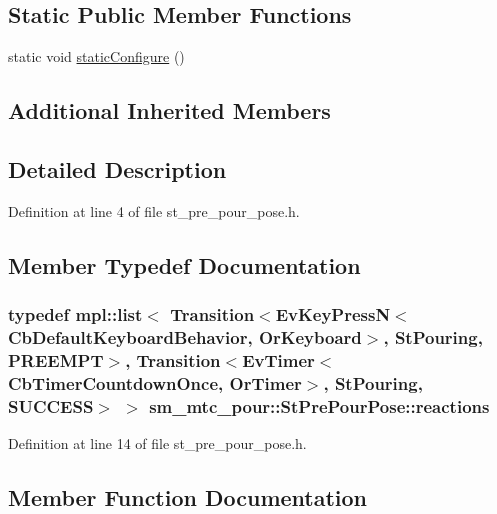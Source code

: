 \subsection*{Static Public Member Functions}
\begin{DoxyCompactItemize}
\item 
static void \hyperlink{structsm__mtc__pour_1_1StPrePourPose_a629a2d7af5a141c4f46159dc5873c051}{static\+Configure} ()
\end{DoxyCompactItemize}
\subsection*{Additional Inherited Members}


\subsection{Detailed Description}


Definition at line 4 of file st\+\_\+pre\+\_\+pour\+\_\+pose.\+h.



\subsection{Member Typedef Documentation}
\subsubsection[{\texorpdfstring{reactions}{reactions}}]{\setlength{\rightskip}{0pt plus 5cm}typedef mpl\+::list$<$ Transition$<$Ev\+Key\+PressN$<$Cb\+Default\+Keyboard\+Behavior, {\bf Or\+Keyboard}$>$, {\bf St\+Pouring}, {\bf P\+R\+E\+E\+M\+PT}$>$, Transition$<$Ev\+Timer$<$Cb\+Timer\+Countdown\+Once, {\bf Or\+Timer}$>$, {\bf St\+Pouring}, {\bf S\+U\+C\+C\+E\+SS}$>$ $>$ {\bf sm\+\_\+mtc\+\_\+pour\+::\+St\+Pre\+Pour\+Pose\+::reactions}}\hypertarget{structsm__mtc__pour_1_1StPrePourPose_aa71925a594abf62a70eb2860a7961d57}{}\label{structsm__mtc__pour_1_1StPrePourPose_aa71925a594abf62a70eb2860a7961d57}


Definition at line 14 of file st\+\_\+pre\+\_\+pour\+\_\+pose.\+h.



\subsection{Member Function Documentation}
